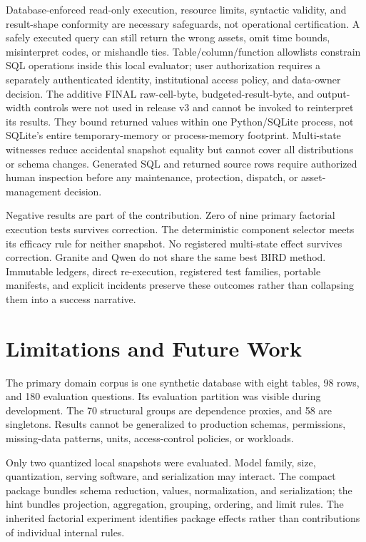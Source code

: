 \documentclass[applsci,article,submit,moreauthors]{Definitions/mdpi}
\begin{document}
Database-enforced read-only execution, resource limits, syntactic validity, and result-shape conformity are necessary safeguards, not operational certification. A safely executed query can still return the wrong assets, omit time bounds, misinterpret codes, or mishandle ties. Table/column/function allowlists constrain SQL operations inside this local evaluator; user authorization requires a separately authenticated identity, institutional access policy, and data-owner decision. The additive FINAL raw-cell-byte, budgeted-result-byte, and output-width controls were not used in release v3 and cannot be invoked to reinterpret its results. They bound returned values within one Python/SQLite process, not SQLite's entire temporary-memory or process-memory footprint. Multi-state witnesses reduce accidental snapshot equality but cannot cover all distributions or schema changes. Generated SQL and returned source rows require authorized human inspection before any maintenance, protection, dispatch, or asset-management decision.

Negative results are part of the contribution. Zero of nine primary factorial execution tests survives correction. The deterministic component selector meets its efficacy rule for neither snapshot. No registered multi-state effect survives correction. Granite and Qwen do not share the same best BIRD method. Immutable ledgers, direct re-execution, registered test families, portable manifests, and explicit incidents preserve these outcomes rather than collapsing them into a success narrative.

\section{Limitations and Future Work}

The primary domain corpus is one synthetic database with eight tables, 98 rows, and 180 evaluation questions. Its evaluation partition was visible during development. The 70 structural groups are dependence proxies, and 58 are singletons. Results cannot be generalized to production schemas, permissions, missing-data patterns, units, access-control policies, or workloads.

Only two quantized local snapshots were evaluated. Model family, size, quantization, serving software, and serialization may interact. The compact package bundles schema reduction, values, normalization, and serialization; the hint bundles projection, aggregation, grouping, ordering, and limit rules. The inherited factorial experiment identifies package effects rather than contributions of individual internal rules.
\end{document}
